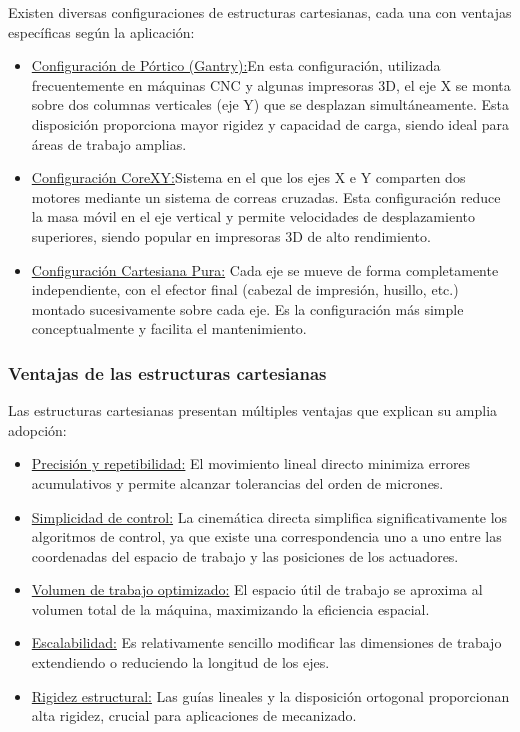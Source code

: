 Existen diversas configuraciones de estructuras cartesianas, cada una con ventajas específicas según la aplicación:
\begin{itemize}[label=$\bullet$]
    \item \underline{Configuración de Pórtico (Gantry):}En esta configuración, utilizada frecuentemente en máquinas CNC y algunas impresoras 3D, el eje X se monta sobre dos columnas verticales (eje Y) que se desplazan simultáneamente. Esta disposición proporciona mayor rigidez y capacidad de carga, siendo ideal para áreas de trabajo amplias.
    \item \underline{Configuración CoreXY:}Sistema en el que los ejes X e Y comparten dos motores mediante un sistema de correas cruzadas. Esta configuración reduce la masa móvil en el eje vertical y permite velocidades de desplazamiento superiores, siendo popular en impresoras 3D de alto rendimiento.
    \item \underline{Configuración Cartesiana Pura:} Cada eje se mueve de forma completamente independiente, con el efector final (cabezal de impresión, husillo, etc.) montado sucesivamente sobre cada eje. Es la configuración más simple conceptualmente y facilita el mantenimiento.
\end{itemize}

\subsubsection{Ventajas de las estructuras cartesianas}

Las estructuras cartesianas presentan múltiples ventajas que explican su amplia adopción:

\begin{itemize}[label=$\bullet$]
    \item \underline{Precisión y repetibilidad:} El movimiento lineal directo minimiza errores acumulativos y permite alcanzar tolerancias del orden de micrones.

    \item \underline{Simplicidad de control:} La cinemática directa simplifica significativamente los algoritmos de control, ya que existe una correspondencia uno a uno entre las coordenadas del espacio de trabajo y las posiciones de los actuadores.

    \item \underline{Volumen de trabajo optimizado:} El espacio útil de trabajo se aproxima al volumen total de la máquina, maximizando la eficiencia espacial.

    \item \underline{Escalabilidad:} Es relativamente sencillo modificar las dimensiones de trabajo extendiendo o reduciendo la longitud de los ejes.

    \item \underline{Rigidez estructural:} Las guías lineales y la disposición ortogonal proporcionan alta rigidez, crucial para aplicaciones de mecanizado.
\end{itemize}

